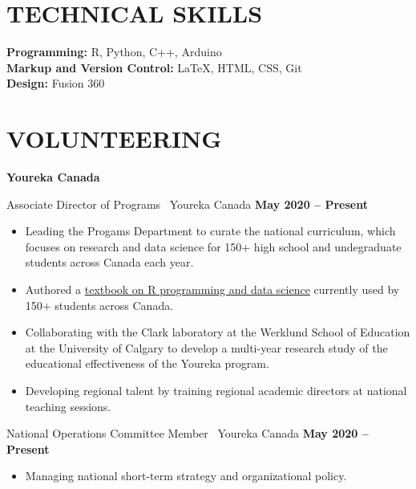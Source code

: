 \documentclass{article}
\begin{document}
\section*{\textcolor{my_colour}{TECHNICAL SKILLS}}
\vspace{-.25em} \hrulefill \vspace{.75em}

\textbf{Programming:} R, Python, C++, Arduino\\
\textbf{Markup and Version Control:} \LaTeX, HTML, CSS, Git\\
\textbf{Design:} Fusion 360


\section*{\textcolor{my_colour}{VOLUNTEERING}}
\vspace{-.25em} \hrulefill \vspace{.75em}

    \textbf{Youreka Canada}

    Associate Director of Programs \textbar\ Youreka Canada \hfill \textbf{May 2020 -- Present}
    \begin{itemize}
        \item Leading the Progams Department to curate the national curriculum, which focuses on research and data science for 150+ high school and undegraduate students across Canada each year.
        \item Authored a \href{https://youreka-textbook.netlify.app/}{textbook on R programming and data science} currently used by 150+ students across Canada.
        \item Collaborating with the Clark laboratory at the Werklund School of Education at the University of Calgary to develop a multi-year research study of the educational effectiveness of the Youreka program.
        \item Developing regional talent by training regional academic directors at national teaching sessions.
    \end{itemize}

    National Operations Committee Member \textbar\ Youreka Canada \hfill \textbf{May 2020 -- Present}
    \begin{itemize}
        \item Managing national short-term strategy and organizational policy.
    \end{itemize}
\end{document}

